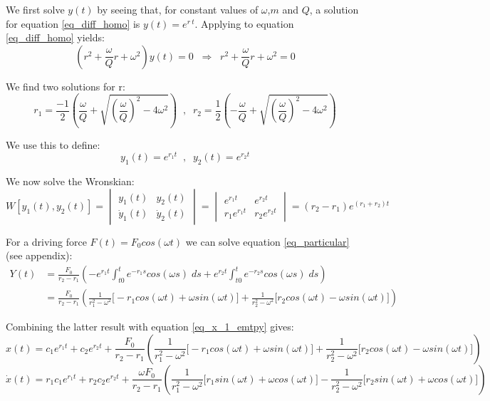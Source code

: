 We first solve $y(t)$ by seeing that, for constant values of $\omega$,$m$ and $Q$, a solution for equation \ref{eq_diff_homo} is  $y(t) = e^{r \: t}$. Applying to equation \ref{eq_diff_homo} yields:
\begin{equation}
	\label{eq_characteristic}
	(r^2 + \frac{\omega}{Q} r + \omega^2) y(t) = 0 \; \; \Rightarrow \; \; r^2 + \frac{\omega}{Q} r + \omega^2 = 0
\end{equation}

We find two solutions for r:
\begin{equation*}
	r_1 = \frac{-1}{2} \left( \frac{\omega}{Q} + \sqrt{\left( \frac{\omega}{Q} \right)^2 -4 \omega^2} \right) \; \; , \; \; r_2 = \frac{1}{2} \left( -\frac{\omega}{Q} + \sqrt{\left( \frac{\omega}{Q} \right)^2 -4 \omega^2} \right)
\end{equation*}

We use this to define:
\begin{equation*}
y_1(t) = e^{r_1 t} \; \; , \; \; y_2(t) = e^{r_2 t}
\end{equation*}

We now solve the Wronskian: 
\begin{equation*}
	W[y_1(t),y_2(t)] = 
	\begin{vmatrix} y_1(t) & y_2(t) \\ \dot{y}_1(t) & \dot{y}_2(t) \end{vmatrix} = 
	\begin{vmatrix} e^{r_1 t} & e^{r_2 t} \\ r_1 e^{r_1 t} & r_2 e^{r_2 t} \end{vmatrix} = (r_2 - r_1) e^{(r_1 + r_2)t}
\end{equation*}

For a driving force $F(t) = F_0 cos(\omega t)$ we can solve equation \ref{eq_particular} (see appendix):
\begin{align*}
	Y(t) &= \frac{F_0}{r_2 - r_1} \left( - e^{r_1 t} \int_{t0}^t e^{-r_1 s} cos(\omega s) \; ds + e^{r_2 t} \int_{t0}^t e^{-r_2 s} cos(\omega s) \; ds \right) \\
	&= \frac{F_0}{r_2 - r_1} \left( \frac{1}{r_1^2 - \omega^2}   \big[ - r_1 cos(\omega t) + \omega sin(\omega t) \big] +  \frac{1}{r_2^2 - \omega^2}   \big[ r_2 cos(\omega t) - \omega sin(\omega t) \big ]\right)
\end{align*}

Combining the latter result with equation \ref{eq_x_1_emtpy} gives:
\begin{equation*}
	x(t) = c_1 e^{r_1 t} + c_2 e^{r_2 t} +  \frac{F_0}{r_2 - r_1} \left(  \frac{1}{r_1^2 - \omega^2}   \big[ - r_1 cos(\omega t) + \omega sin(\omega t) \big] +  \frac{1}{r_2^2 - \omega^2}   \big[ r_2 cos(\omega t) - \omega sin(\omega t) \big]\right)
\end{equation*}
\begin{equation*}
	\dot{x}(t) = r_1 c_1 e^{r_1 t} + r_2 c_2 e^{r_2 t} +  \frac{\omega F_0 }{r_2 - r_1} \left( \frac{1}{r_1^2 - \omega^2}   \big[ r_1 sin(\omega t) + \omega cos(\omega t) \big] -  \frac{1}{r_2^2 - \omega^2}   \big[ r_2 sin(\omega t) + \omega cos(\omega t) \big]\right)
\end{equation*}

